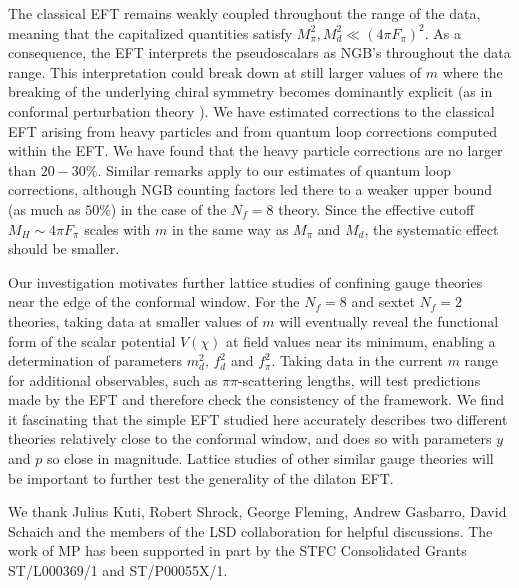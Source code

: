 \documentclass[a4paper,11pt]{article}
\begin{document}
The classical EFT remains weakly coupled throughout the range of the data, meaning that the capitalized quantities satisfy $M_{\pi}^{2}, M_{d}^2  \ll (4 \pi F_{\pi})^2$. As a consequence, the EFT interprets the pseudoscalars as NGB's throughout the data range. This interpretation could break down at still larger values of $m$ where the breaking of the underlying chiral symmetry becomes dominantly explicit (as in conformal perturbation theory \cite{CPT}). We have estimated corrections to the classical EFT arising from heavy particles and from quantum loop corrections computed within the EFT. We have found that the heavy particle corrections are no larger than $20-30\%$. Similar remarks apply to our estimates of quantum loop corrections, although NGB counting factors led there to a weaker upper bound (as much as $50\%$) in the case of the $N_f=8$ theory. Since the effective cutoff $M_H\sim4 \pi F_{\pi}$ scales with $m$ in the same way as $M_\pi$ and $M_d$, the systematic effect should be smaller.

Our investigation motivates further lattice studies of confining gauge theories near the edge of the conformal window. For the $N_f=8$ and sextet $N_f=2$ theories, taking data at smaller values of $m$ will eventually reveal the functional form of the scalar potential $V(\chi)$ at field values near its minimum, enabling a determination of parameters $m^2_d,\,f^2_d$ and $f^2_\pi$. Taking data in the current $m$ range for additional observables, such as $\pi\pi$-scattering lengths, will test predictions made by the EFT and therefore check the consistency of the framework. We find it fascinating that the simple EFT studied here accurately describes two different theories relatively close to the conformal window, and does so with parameters $y$ and $p$ so close in magnitude. Lattice studies of other similar gauge theories will be important to further test the generality of the dilaton EFT.



\vspace{1.0cm}
\begin{acknowledgments}
We thank Julius Kuti, Robert Shrock, George Fleming, Andrew Gasbarro, David Schaich and the members of the LSD collaboration for helpful discussions. The work of MP has been supported in part by the STFC Consolidated Grants ST/L000369/1 and ST/P00055X/1.
\end{acknowledgments}
\end{document}

